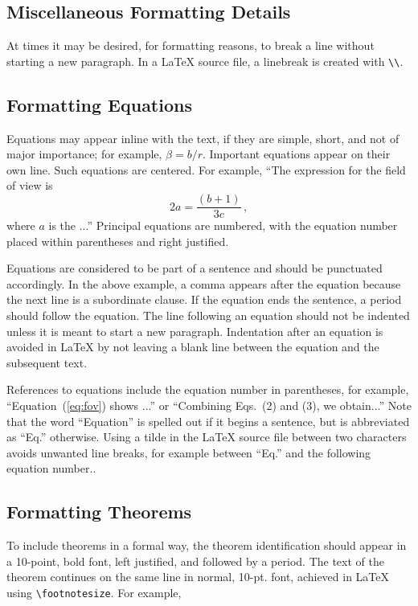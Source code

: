 \documentclass[12pt]{spieman}  %
\begin{document}
\begin{spacing}{2}
\section{Miscellaneous Formatting Details}
\label{sect:misc}
At times it may be desired, for formatting reasons, to break a line without starting a new paragraph. In a LaTeX source file, a linebreak is created with \verb|\\|.


\subsection{Formatting Equations}
Equations may appear inline with the text, if they are simple, short, and not of major importance; for example, $\beta = b/r$.  Important equations appear on their own line.  Such equations are centered.  For example, ``The expression for the field of view is
\begin{equation}
\label{eq:fov}
2 a = \frac{(b + 1)}{3c} \, ,
\end{equation}
where $a$ is the ...''  Principal equations are numbered, with the equation number placed within parentheses and right justified.

Equations are considered to be part of a sentence and should be punctuated accordingly. In the above example, a comma appears after the equation because the next line is a subordinate clause. If the equation ends the sentence, a period should follow the equation. The line following an equation should not be indented unless it is meant to start a new paragraph. Indentation after an equation is avoided in LaTeX by not leaving a blank line between the equation and the subsequent text.

References to equations include the equation number in parentheses, for example, ``Equation~(\ref{eq:fov}) shows ...'' or ``Combining Eqs.~(2) and (3), we obtain...'' Note that the word ``Equation'' is spelled out if it begins a sentence, but is abbreviated as ``Eq.'' otherwise. Using a tilde in the LaTeX source file between two characters avoids unwanted line breaks, for example between ``Eq.'' and the following equation number..

\subsection{Formatting Theorems}

To include theorems in a formal way, the theorem identification should appear in a 10-point, bold font, left justified, and followed by a period.  The text of the theorem continues on the same line in normal, 10-pt. font, achieved in LaTeX using \verb|\footnotesize|.  For example,


\end{spacing}
\end{document}
